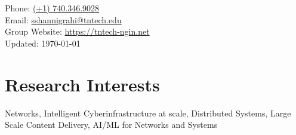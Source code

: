 \documentclass[11pt, letterpaper]{article}
\def\myweb{https://susm.it}
\def\groupweb{https://tntech-ngin.net}
\begin{document}
  




\medskip

\pagestyle{fancy}
\renewcommand{\headrulewidth}{0pt}
\fancyhead{}
\fancyfoot{}

\fancyfoot[RO,RE]{\thepage/\pageref{LastPage}}




\begin{minipage}[t]{3in}
   


\end{minipage}
\hfill
\begin{minipage}[t]{0.0in}
\end{minipage}
\hfill
\begin{minipage}[t]{2in}
  \flushright \footnotesize Phone: \href{tel:17403469028}{(+1) 740.346.9028} \\
  Email: \href{mailto:sshannigrahi@tntech.edu}{sshannigrahi@tntech.edu} \\
  Group Website: \href{\groupweb}{\groupweb}\\
  Updated: \today\\
  
\end{minipage}

\vspace{2em}

\section{Research Interests}
    Networks, Intelligent Cyberinfrastructure at scale, Distributed Systems, Large Scale Content Delivery, AI/ML for Networks and Systems 
    
\end{document}
